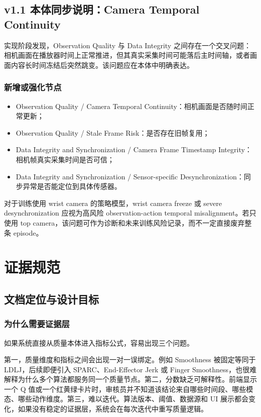 \documentclass[UTF8,zihao=-4,oneside,openany]{ctexrep}
\begin{document}
\newpage
\section*{v1.1 本体同步说明：Camera Temporal Continuity}

实现阶段发现，Observation Quality 与 Data Integrity 之间存在一个交叉问题：相机画面在播放器时间上正常推进，但其真实采集时间可能落后主时间轴，或者画面内容长时间冻结后突然跳变。该问题应在本体中明确表达。

\subsection*{新增或强化节点}

\begin{itemize}
\item Observation Quality / Camera Temporal Continuity：相机画面是否随时间正常更新；
\item Observation Quality / Stale Frame Risk：是否存在旧帧复用；
\item Data Integrity and Synchronization / Camera Frame Timestamp Integrity：相机帧真实采集时间是否可信；
\item Data Integrity and Synchronization / Sensor-specific Desynchronization：同步异常是否能定位到具体传感器。
\end{itemize}

对于训练使用 wrist camera 的策略模型，wrist camera freeze 或 severe desynchronization 应视为高风险 observation-action temporal misalignment。若只使用 top camera，该问题可作为诊断和未来训练风险记录，而不一定直接废弃整条 episode。

\clearpage

\chapter{证据规范}

\section{文档定位与设计目标}

\subsection{为什么需要证据层}

如果系统直接从质量本体进入指标公式，容易出现三个问题。

第一，质量维度和指标之间会出现一对一误绑定。例如 Smoothness 被固定等同于 LDLJ，后续即便引入 SPARC、End-Effector Jerk 或 Finger Smoothness，也很难解释为什么多个算法都服务同一个质量节点。第二，分数缺乏可解释性。前端显示一个 Q 值或一个红黄绿卡片时，审核员并不知道该结论来自哪些时间段、哪些模态、哪些动作维度。第三，难以迭代。算法版本、阈值、数据源和 UI 展示都会变化，如果没有稳定的证据层，系统会在每次迭代中重写质量逻辑。
\end{document}
